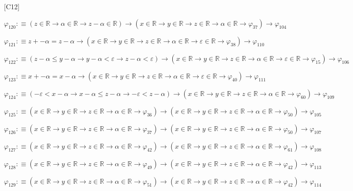 \begin{fullproof}{[C12]}
\begin{abbrevlist}
\item $\varphi_{120} :\equiv (z \in \mathbb{R} \to \alpha \in \mathbb{R} \to z - \alpha \in \mathbb{R}) \to (x \in \mathbb{R} \to y \in \mathbb{R} \to z \in \mathbb{R} \to \alpha \in \mathbb{R} \to \varphi_{37}) \to \varphi_{104}$
\item $\varphi_{121} :\equiv z + -\alpha = z - \alpha \to (x \in \mathbb{R} \to y \in \mathbb{R} \to z \in \mathbb{R} \to \alpha \in \mathbb{R} \to \varepsilon \in \mathbb{R} \to \varphi_{38}) \to \varphi_{110}$
\item $\varphi_{122} :\equiv (z - \alpha \leq y - \alpha \to y - \alpha < \varepsilon \to z - \alpha < \varepsilon) \to (x \in \mathbb{R} \to y \in \mathbb{R} \to z \in \mathbb{R} \to \alpha \in \mathbb{R} \to \varepsilon \in \mathbb{R} \to \varphi_{15}) \to \varphi_{106}$
\item $\varphi_{123} :\equiv x + -\alpha = x - \alpha \to (x \in \mathbb{R} \to y \in \mathbb{R} \to z \in \mathbb{R} \to \alpha \in \mathbb{R} \to \varepsilon \in \mathbb{R} \to \varphi_{40}) \to \varphi_{111}$
\item $\varphi_{124} :\equiv (-\varepsilon < x - \alpha \to x - \alpha \leq z - \alpha \to -\varepsilon < z - \alpha) \to (x \in \mathbb{R} \to y \in \mathbb{R} \to z \in \mathbb{R} \to \alpha \in \mathbb{R} \to \varphi_{60}) \to \varphi_{109}$
\item $\varphi_{125} :\equiv (x \in \mathbb{R} \to y \in \mathbb{R} \to z \in \mathbb{R} \to \alpha \in \mathbb{R} \to \varphi_{36}) \to (x \in \mathbb{R} \to y \in \mathbb{R} \to z \in \mathbb{R} \to \alpha \in \mathbb{R} \to \varphi_{50}) \to \varphi_{105}$
\item $\varphi_{126} :\equiv (x \in \mathbb{R} \to y \in \mathbb{R} \to z \in \mathbb{R} \to \alpha \in \mathbb{R} \to \varphi_{37}) \to (x \in \mathbb{R} \to y \in \mathbb{R} \to z \in \mathbb{R} \to \alpha \in \mathbb{R} \to \varphi_{50}) \to \varphi_{107}$
\item $\varphi_{127} :\equiv (x \in \mathbb{R} \to y \in \mathbb{R} \to z \in \mathbb{R} \to \alpha \in \mathbb{R} \to \varphi_{42}) \to (x \in \mathbb{R} \to y \in \mathbb{R} \to z \in \mathbb{R} \to \alpha \in \mathbb{R} \to \varphi_{61}) \to \varphi_{108}$
\item $\varphi_{128} :\equiv (x \in \mathbb{R} \to y \in \mathbb{R} \to z \in \mathbb{R} \to \alpha \in \mathbb{R} \to \varphi_{49}) \to (x \in \mathbb{R} \to y \in \mathbb{R} \to z \in \mathbb{R} \to \alpha \in \mathbb{R} \to \varphi_{42}) \to \varphi_{113}$
\item $\varphi_{129} :\equiv (x \in \mathbb{R} \to y \in \mathbb{R} \to z \in \mathbb{R} \to \alpha \in \mathbb{R} \to \varphi_{51}) \to (x \in \mathbb{R} \to y \in \mathbb{R} \to z \in \mathbb{R} \to \alpha \in \mathbb{R} \to \varphi_{42}) \to \varphi_{114}$

\end{abbrevlist}
\end{fullproof}
